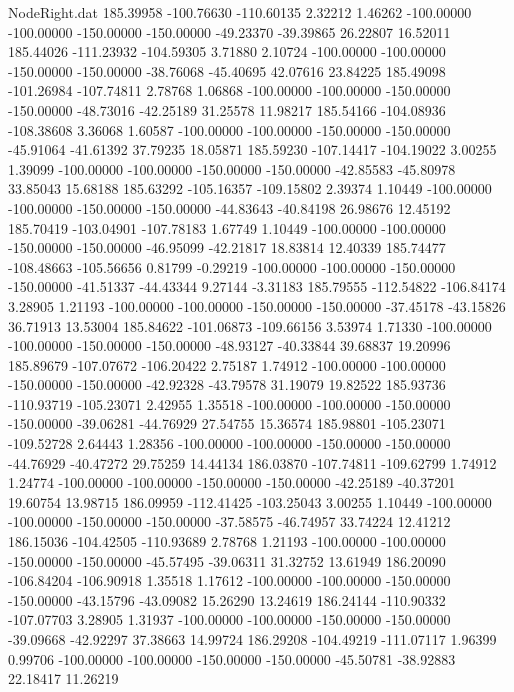 \begin{filecontents}{NodeRight.dat}
 185.39958 -100.76630 -110.60135     2.32212    1.46262 -100.00000 -100.00000 -150.00000 -150.00000  -49.23370  -39.39865   26.22807   16.52011
 185.44026 -111.23932 -104.59305     3.71880    2.10724 -100.00000 -100.00000 -150.00000 -150.00000  -38.76068  -45.40695   42.07616   23.84225
 185.49098 -101.26984 -107.74811     2.78768    1.06868 -100.00000 -100.00000 -150.00000 -150.00000  -48.73016  -42.25189   31.25578   11.98217
 185.54166 -104.08936 -108.38608     3.36068    1.60587 -100.00000 -100.00000 -150.00000 -150.00000  -45.91064  -41.61392   37.79235   18.05871
 185.59230 -107.14417 -104.19022     3.00255    1.39099 -100.00000 -100.00000 -150.00000 -150.00000  -42.85583  -45.80978   33.85043   15.68188
 185.63292 -105.16357 -109.15802     2.39374    1.10449 -100.00000 -100.00000 -150.00000 -150.00000  -44.83643  -40.84198   26.98676   12.45192
 185.70419 -103.04901 -107.78183     1.67749    1.10449 -100.00000 -100.00000 -150.00000 -150.00000  -46.95099  -42.21817   18.83814   12.40339
 185.74477 -108.48663 -105.56656     0.81799   -0.29219 -100.00000 -100.00000 -150.00000 -150.00000  -41.51337  -44.43344    9.27144   -3.31183
 185.79555 -112.54822 -106.84174     3.28905    1.21193 -100.00000 -100.00000 -150.00000 -150.00000  -37.45178  -43.15826   36.71913   13.53004
 185.84622 -101.06873 -109.66156     3.53974    1.71330 -100.00000 -100.00000 -150.00000 -150.00000  -48.93127  -40.33844   39.68837   19.20996
 185.89679 -107.07672 -106.20422     2.75187    1.74912 -100.00000 -100.00000 -150.00000 -150.00000  -42.92328  -43.79578   31.19079   19.82522
 185.93736 -110.93719 -105.23071     2.42955    1.35518 -100.00000 -100.00000 -150.00000 -150.00000  -39.06281  -44.76929   27.54755   15.36574
 185.98801 -105.23071 -109.52728     2.64443    1.28356 -100.00000 -100.00000 -150.00000 -150.00000  -44.76929  -40.47272   29.75259   14.44134
 186.03870 -107.74811 -109.62799     1.74912    1.24774 -100.00000 -100.00000 -150.00000 -150.00000  -42.25189  -40.37201   19.60754   13.98715
 186.09959 -112.41425 -103.25043     3.00255    1.10449 -100.00000 -100.00000 -150.00000 -150.00000  -37.58575  -46.74957   33.74224   12.41212
 186.15036 -104.42505 -110.93689     2.78768    1.21193 -100.00000 -100.00000 -150.00000 -150.00000  -45.57495  -39.06311   31.32752   13.61949
 186.20090 -106.84204 -106.90918     1.35518    1.17612 -100.00000 -100.00000 -150.00000 -150.00000  -43.15796  -43.09082   15.26290   13.24619
 186.24144 -110.90332 -107.07703     3.28905    1.31937 -100.00000 -100.00000 -150.00000 -150.00000  -39.09668  -42.92297   37.38663   14.99724
 186.29208 -104.49219 -111.07117     1.96399    0.99706 -100.00000 -100.00000 -150.00000 -150.00000  -45.50781  -38.92883   22.18417   11.26219

\end{filecontents}
